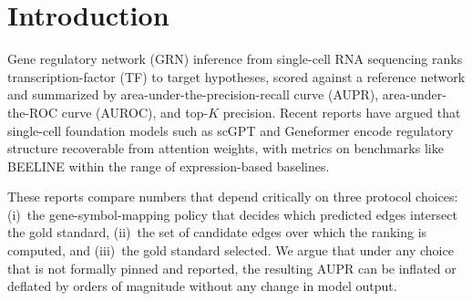 \documentclass[sigconf]{acmart}
\begin{document}


\maketitle

\section{Introduction}
\label{sec:intro}

Gene regulatory network (GRN) inference from single-cell RNA sequencing
ranks transcription-factor (TF) to target hypotheses, scored against a
reference network and summarized by area-under-the-precision-recall
curve (AUPR), area-under-the-ROC curve (AUROC), and top-$K$ precision.
Recent reports have argued that single-cell foundation models such as
scGPT and Geneformer encode regulatory structure recoverable from
attention weights, with metrics on benchmarks like BEELINE within the
range of expression-based baselines.

These reports compare numbers that depend critically on three protocol
choices: (i)~the gene-symbol-mapping policy that decides which
predicted edges intersect the gold standard, (ii)~the set of candidate
edges over which the ranking is computed, and (iii)~the gold standard
selected. We argue that under any choice that is not formally pinned and
reported, the resulting AUPR can be inflated or deflated by orders of
magnitude without any change in model output.
\end{document}
